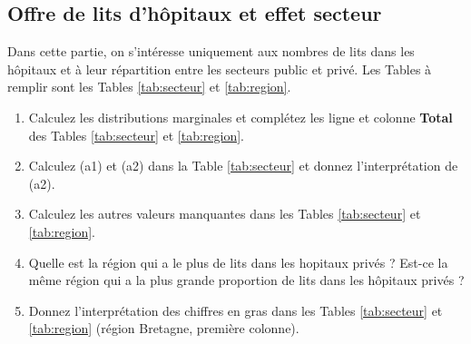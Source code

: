 \documentclass[a4paper,11pt]{article}
\begin{document}
\subsection{Offre de lits d'hôpitaux et effet secteur}

Dans cette partie, on s'intéresse uniquement aux nombres de lits dans les hôpitaux et à leur répartition entre les secteurs public et privé. Les Tables à remplir sont les Tables \ref{tab:secteur} et \ref{tab:region}.

\bigskip
\begin{enumerate}

\item Calculez les distributions marginales et complétez les ligne et colonne \textbf{Total} des Tables \ref{tab:secteur} et \ref{tab:region}.



\item  Calculez (a1) et (a2) dans la Table  \ref{tab:secteur} et donnez l'interprétation de (a2).


\item Calculez les autres valeurs manquantes dans les Tables \ref{tab:secteur} et \ref{tab:region}.
\medskip









\item Quelle est la région qui a le plus de lits dans les hopitaux privés ? Est-ce la même région qui a la plus grande proportion de lits dans les hôpitaux privés ?


\item Donnez l'interprétation des chiffres en gras dans les Tables \ref{tab:secteur} et \ref{tab:region} (région Bretagne, première colonne).


\end{enumerate}
\end{document}
